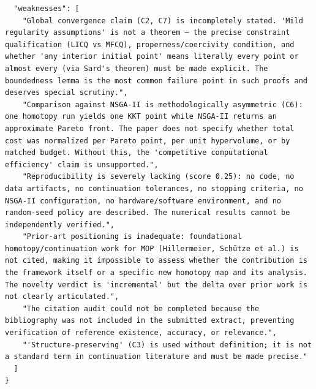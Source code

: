 \documentclass[11pt]{article}
\begin{document}
\begin{verbatim}
  "weaknesses": [
    "Global convergence claim (C2, C7) is incompletely stated. 'Mild regularity assumptions' is not a theorem — the precise constraint qualification (LICQ vs MFCQ), properness/coercivity condition, and whether 'any interior initial point' means literally every point or almost every (via Sard's theorem) must be made explicit. The boundedness lemma is the most common failure point in such proofs and deserves special scrutiny.",
    "Comparison against NSGA-II is methodologically asymmetric (C6): one homotopy run yields one KKT point while NSGA-II returns an approximate Pareto front. The paper does not specify whether total cost was normalized per Pareto point, per unit hypervolume, or by matched budget. Without this, the 'competitive computational efficiency' claim is unsupported.",
    "Reproducibility is severely lacking (score 0.25): no code, no data artifacts, no continuation tolerances, no stopping criteria, no NSGA-II configuration, no hardware/software environment, and no random-seed policy are described. The numerical results cannot be independently verified.",
    "Prior-art positioning is inadequate: foundational homotopy/continuation work for MOP (Hillermeier, Schütze et al.) is not cited, making it impossible to assess whether the contribution is the framework itself or a specific new homotopy map and its analysis. The novelty verdict is 'incremental' but the delta over prior work is not clearly articulated.",
    "The citation audit could not be completed because the bibliography was not included in the submitted extract, preventing verification of reference existence, accuracy, or relevance.",
    "'Structure-preserving' (C3) is used without definition; it is not a standard term in continuation literature and must be made precise."
  ]
}
\end{verbatim}
\end{document}
